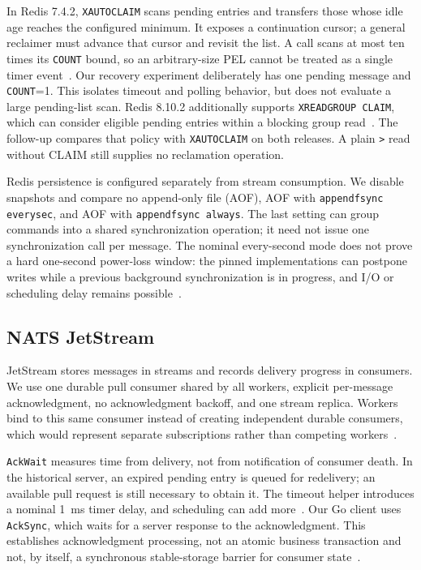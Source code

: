 \documentclass[11pt]{article}
\theoremstyle{definition}
\newcommand{\code}[1]{\texttt{#1}}
\begin{document}
In Redis 7.4.2, \code{XAUTOCLAIM} scans pending entries and transfers those whose idle age reaches the configured minimum. It exposes a continuation cursor; a general reclaimer must advance that cursor and revisit the list. A call scans at most ten times its \code{COUNT} bound, so an arbitrary-size PEL cannot be treated as a single timer event~\cite{redisxautoclaim,redis742stream}. Our recovery experiment deliberately has one pending message and \code{COUNT}=1. This isolates timeout and polling behavior, but does not evaluate a large pending-list scan. Redis 8.10.2 additionally supports \code{XREADGROUP CLAIM}, which can consider eligible pending entries within a blocking group read~\cite{redis8102stream}. The follow-up compares that policy with \code{XAUTOCLAIM} on both releases. A plain \code{>} read without CLAIM still supplies no reclamation operation.

Redis persistence is configured separately from stream consumption. We disable snapshots and compare no append-only file (AOF), AOF with \code{appendfsync everysec}, and AOF with \code{appendfsync always}. The last setting can group commands into a shared synchronization operation; it need not issue one synchronization call per message. The nominal every-second mode does not prove a hard one-second power-loss window: the pinned implementations can postpone writes while a previous background synchronization is in progress, and I/O or scheduling delay remains possible~\cite{redispersistence,redis742aof,redis8102aof,redis742config}.

\subsection{NATS JetStream}

JetStream stores messages in streams and records delivery progress in consumers. We use one durable pull consumer shared by all workers, explicit per-message acknowledgment, no acknowledgment backoff, and one stream replica. Workers bind to this same consumer instead of creating independent durable consumers, which would represent separate subscriptions rather than competing workers~\cite{natsconsumers}.

\code{AckWait} measures time from delivery, not from notification of consumer death. In the historical server, an expired pending entry is queued for redelivery; an available pull request is still necessary to obtain it. The timeout helper introduces a nominal 1~ms timer delay, and scheduling can add more~\cite{nats21024consumer}. Our Go client uses \code{AckSync}, which waits for a server response to the acknowledgment. This establishes acknowledgment processing, not an atomic business transaction and not, by itself, a synchronous stable-storage barrier for consumer state~\cite{natsgo1391}.
\end{document}
